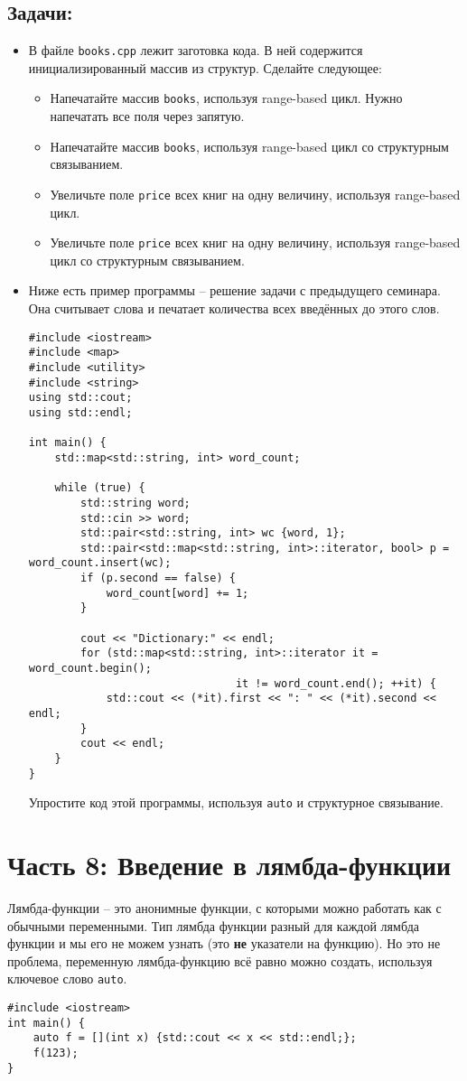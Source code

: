 \documentclass{article}
\begin{document}
\subsection*{Задачи:}
\begin{itemize}
\item В файле \texttt{books.cpp} лежит заготовка кода. В ней содержится инициализированный массив из структур. Сделайте следующее:
\begin{itemize}
\item Напечатайте массив \texttt{books}, используя range-based цикл. Нужно напечатать все поля через запятую.
\item Напечатайте массив \texttt{books}, используя range-based цикл со структурным связыванием.
\item Увеличьте поле \texttt{price} всех книг на одну величину, используя range-based цикл.
\item Увеличьте поле \texttt{price} всех книг на одну величину, используя range-based цикл со структурным связыванием.
\end{itemize}
\item Ниже есть пример программы -- решение задачи с предыдущего семинара. Она считывает слова и печатает количества всех введённых до этого слов.
\begin{lstlisting}
#include <iostream>
#include <map>
#include <utility>
#include <string>
using std::cout;
using std::endl;

int main() {
    std::map<std::string, int> word_count;
    
    while (true) {
        std::string word;
        std::cin >> word;
        std::pair<std::string, int> wc {word, 1};
        std::pair<std::map<std::string, int>::iterator, bool> p = word_count.insert(wc);
        if (p.second == false) {
            word_count[word] += 1;
        }
        
        cout << "Dictionary:" << endl;
        for (std::map<std::string, int>::iterator it = word_count.begin(); 
                                it != word_count.end(); ++it) {
            std::cout << (*it).first << ": " << (*it).second << endl;
        }
        cout << endl;
    } 
}
\end{lstlisting}
Упростите код этой программы, используя \texttt{auto} и структурное связывание.
\end{itemize}

\newpage
\section*{Часть 8: Введение в лямбда-функции}
Лямбда-функции -- это анонимные функции, с которыми можно работать как с обычными переменными. Тип лямбда функции разный для каждой лямбда функции и мы его не можем узнать (это \textbf{не} указатели на функцию). Но это не проблема, переменную лямбда-функцию всё равно можно создать, используя ключевое слово \texttt{auto}.
\begin{lstlisting}
#include <iostream>
int main() {
    auto f = [](int x) {std::cout << x << std::endl;};
    f(123);
}
\end{lstlisting}
\end{document}
